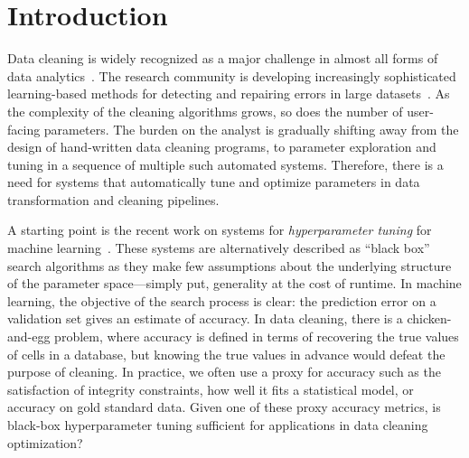 \section{Introduction}\label{intro}\sloppy
Data cleaning is widely recognized as a major challenge in almost all forms of data analytics~\cite{nytimes}. 
The research community is developing increasingly sophisticated learning-based methods for detecting and repairing errors in large datasets~\cite{dc, rekatsinas2017holoclean, DBLP:journals/pvldb/KrishnanWWFG16, DBLP:conf/sigmod/ChuIKW16, mudgal2018deep, doan2018toward}.
As the complexity of the cleaning algorithms grows, so does the number of user-facing parameters.
The burden on the analyst is gradually shifting away from the design of hand-written data cleaning programs, to parameter exploration and tuning in a sequence of multiple such automated systems.
Therefore, there is a need for systems that automatically tune and optimize parameters in data transformation and cleaning pipelines.

A starting point is the recent work on systems for \emph{hyperparameter tuning} for machine learning~\cite{li2017hyperband, sparks2017keystoneml, baylor2017tfx, golovin2017google, liaw2018tune}.
These systems are alternatively described as ``black box'' search algorithms as they make few assumptions about the underlying structure of the parameter space---simply put, generality at the cost of runtime.
In machine learning, the objective of the search process is clear: the prediction error on a validation set gives an estimate of accuracy. 
In data cleaning, there is a chicken-and-egg problem, where accuracy is defined in terms of recovering the true values of cells in a database, but knowing the true values in advance would defeat the purpose of cleaning.
In practice, we often use a proxy for accuracy such as the satisfaction of integrity constraints, how well it fits a statistical model, or accuracy on gold standard data.
Given one of these proxy accuracy metrics, is black-box hyperparameter tuning sufficient for applications in data cleaning optimization?


